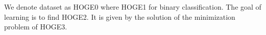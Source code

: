             We denote dataset as HOGE0
            where HOGE1 for binary classification.
            The goal of learning is to find HOGE2.
            It is given by the solution of the minimization problem of HOGE3.
